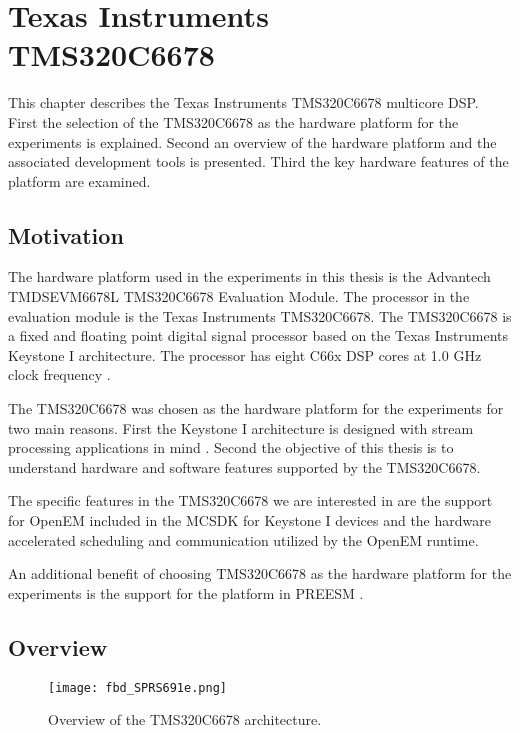 \chapter[Texas Instruments TMS320C6678]{Texas Instruments\\TMS320C6678}
\label{chapter:c6678}
This chapter describes the Texas Instruments TMS320C6678 multicore DSP. First
the selection of the TMS320C6678 as the hardware platform for the experiments
is explained. Second an overview of the hardware platform and the associated
development tools is presented. Third the key hardware features of the 
platform are examined.

\section{Motivation}
The hardware platform used in the experiments in this thesis is the  
Advantech TMDSEVM6678L TMS320C6678 Evaluation Module. The processor in the
evaluation module is the Texas Instruments TMS320C6678. The TMS320C6678
is a fixed and floating point digital signal processor based on the
Texas Instruments Keystone I architecture. The processor has eight
C66x DSP cores at 1.0 GHz clock frequency \cite{tmsdatasheet}.

The TMS320C6678 was chosen as the hardware platform for the experiments
for two main reasons. First the Keystone I architecture is designed with
stream processing applications in mind \cite{multicorevideo}. Second the
objective of this thesis is to understand hardware and software features
supported by the TMS320C6678.

The specific features in the TMS320C6678 we are interested in are the
support for OpenEM included in the MCSDK for Keystone I devices
\cite{MCSDKbrochure} and the hardware accelerated scheduling and
communication utilized by the OpenEM runtime. 

An additional benefit of choosing TMS320C6678 as the hardware platform for
the experiments is the support for the platform in PREESM
\cite{pelcat2014preesm}.
\section{Overview}

\begin{figure}[h!]
    \label{arch_overview}
    \begin{center}
        \texttt{[image: fbd\_SPRS691e.png]} %
        \caption{Overview of the TMS320C6678 architecture.}
    \end{center}
\end{figure}

